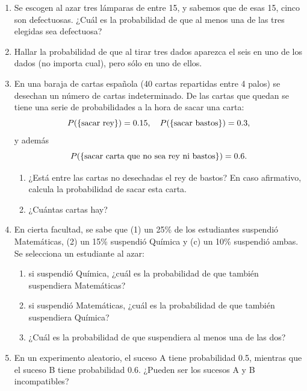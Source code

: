 \documentclass[10pt,a4paper]{article}\usepackage[]{graphicx}\usepackage[]{color}
\begin{document}
\begin{enumerate}
    \item Se escogen al azar tres lámparas de entre 15, y sabemos que de esas 15, cinco son defectuosas. ¿Cuál es la probabilidad de que al menos una de las tres elegidas sea defectuosa?



    \item Hallar la probabilidad de que al tirar tres dados aparezca el seis en uno de los dados (no importa cual), pero sólo en uno de ellos.



    \item En una baraja de cartas espa\~nola (40 cartas repartidas entre 4 palos) se desechan un n\'umero de cartas indeterminado. De las cartas que quedan se tiene una serie de probabilidades a la hora de sacar una carta:
        $$P(\{\hbox{sacar rey}\})=0.15,\quad P(\{\hbox{sacar bastos}\})=0.3,$$
        y adem\'as
        $$P(\{\hbox{sacar carta que no sea rey ni bastos}\})=0.6.$$
            \begin{enumerate}
            \item ¿Est\'a entre las cartas no desechadas el rey de bastos? En caso afirmativo, calcula la probabilidad de sacar esta carta.
            \item ¿Cu\'antas cartas hay?
            \end{enumerate}


    \item En cierta facultad, se sabe que (1) un 25\% de los estudiantes suspendió Matemáticas, (2) un 15\% suspendió Química y (c) un 10\% suspendió ambas. Se selecciona un estudiante al azar:
        \begin{enumerate}
            \item si suspendió Química, ¿cuál es la probabilidad de que también suspendiera Matemáticas?
            \item si suspendió Matemáticas, ¿cuál es la probabilidad de que también suspendiera Química?
            \item ¿Cuál es la probabilidad de que suspendiera al menos una de las dos?
        \end{enumerate}

    \item En un experimento aleatorio, el suceso A tiene probabilidad 0.5, mientras que el suceso B tiene probabilidad 0.6. ¿Pueden ser los sucesos A y B incompatibles?


\end{enumerate}
\end{document}
